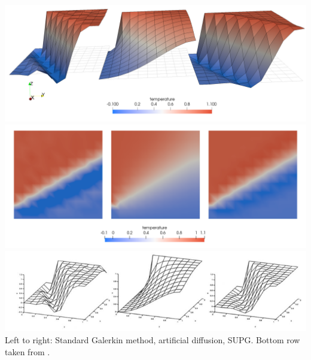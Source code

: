 \begin{center}
\includegraphics[width=15cm]{python_codes/fieldstone_65/results/exp2/Temps}\\
\includegraphics[width=15cm]{python_codes/fieldstone_65/results/exp2/Temps2}\\
\includegraphics[width=15cm]{python_codes/fieldstone_65/images/exp2}\\
{\captionfont Left to right: Standard Galerkin method, artificial diffusion, SUPG. 
Bottom row taken from \cite{dohu03}. }
\end{center}



